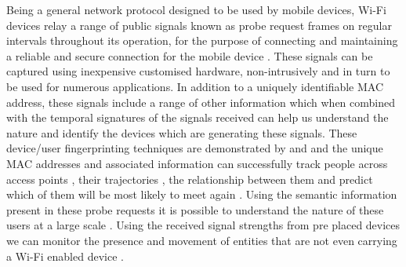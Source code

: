 Being a general network protocol designed to be used by mobile devices, Wi-Fi devices relay a range of public signals known as probe request frames on regular intervals throughout its operation, for the purpose of connecting and maintaining a reliable and secure connection for the mobile device \citep{freud2015}.
These signals can be captured using inexpensive customised hardware, non-intrusively and in turn to be used for numerous applications.
In addition to a uniquely identifiable MAC address, these signals include a range of other information which when combined with the temporal signatures of the signals received can help us understand the nature and identify the devices which are generating these signals.
These device/user fingerprinting techniques are demonstrated by \citep{franklin2006} and \citep{pang2007} and the unique MAC addresses and associated information can successfully track people across access points \cite{cunche2014a}, their trajectories \citep{musa2012}, the relationship between them \citep{cheng2012, barbera2013, cunche2014} and predict which of them will be most likely to meet again \citep{cunche2012}.
Using the semantic information present in these probe requests it is possible to understand the nature of these users at a large scale \citep{di2016}.
Using the received signal strengths from pre placed devices we can monitor the presence and movement of entities that are not even carrying a Wi-Fi enabled device \citep{elgohary2013}.

